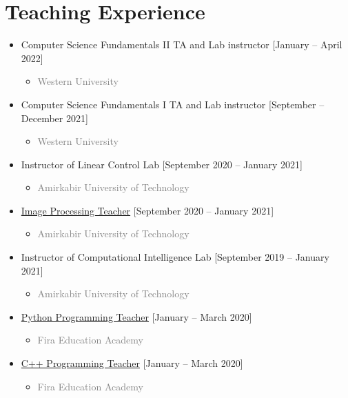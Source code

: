 \documentclass[10pt,a4paper,sans]{moderncv} %
\begin{document}
	\section{Teaching Experience}
		\begin{itemize}
		\item {} {Computer Science Fundamentals II TA and Lab instructor} \hfill [January -- April 2022]
			\begin{itemize}
				\item \textcolor{gray}{Western University}
			\end{itemize}
			
		\item {} {Computer Science Fundamentals I TA and Lab instructor} \hfill [September -- December 2021]
			\begin{itemize}
				\item \textcolor{gray}{Western University}
			\end{itemize}
			
		\item {} Instructor of Linear Control Lab \hfill [September 2020 -- January 2021]
			\begin{itemize}
				\item \textcolor{gray}{Amirkabir University of Technology}
			\end{itemize}
		\item {}\href{https://ramantech.academy/}{Image Processing Teacher} \hfill [September 2020 -- January 2021]
			\begin{itemize}
				\item \textcolor{gray}{Amirkabir University of Technology}
			\end{itemize}
			\item {} Instructor of Computational Intelligence Lab \hfill [September 2019 -- January 2021]
			\begin{itemize}
				\item \textcolor{gray}{Amirkabir University of Technology}
			\end{itemize}
					
			\item {} \href{https://ramantech.academy/}{Python Programming Teacher} \hfill [January -- March 2020]
			\begin{itemize}
				\item \textcolor{gray}{Fira Education Academy}
			\end{itemize}
			\item {} \href{https://ramantech.academy/}{C++ Programming Teacher} \hfill [January -- March 2020]
			\begin{itemize}
				\item \textcolor{gray}{Fira Education Academy}
			\end{itemize}			
			

\end{itemize}
\end{document}
